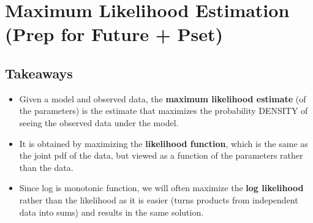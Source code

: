 \documentclass[11pt,letterpaper]{article}
\begin{document}
\section{Maximum Likelihood Estimation (Prep for Future + Pset)}
\subsection{Takeaways}
\begin{itemize}
    \item Given a model and observed data, the \textbf{maximum likelihood estimate} (of the parameters) is the estimate that maximizes the probability DENSITY of seeing the observed data under the model.
    \item  It is obtained by maximizing the \textbf{likelihood function}, which is the same as the joint pdf of the data, but viewed as a function of the parameters rather than the data.
    \item Since log is monotonic function, we will often maximize the \textbf{log likelihood} rather than the likelihood as it is easier (turns products from independent data into sums) and results in the same solution.
\end{itemize}
\end{document}
